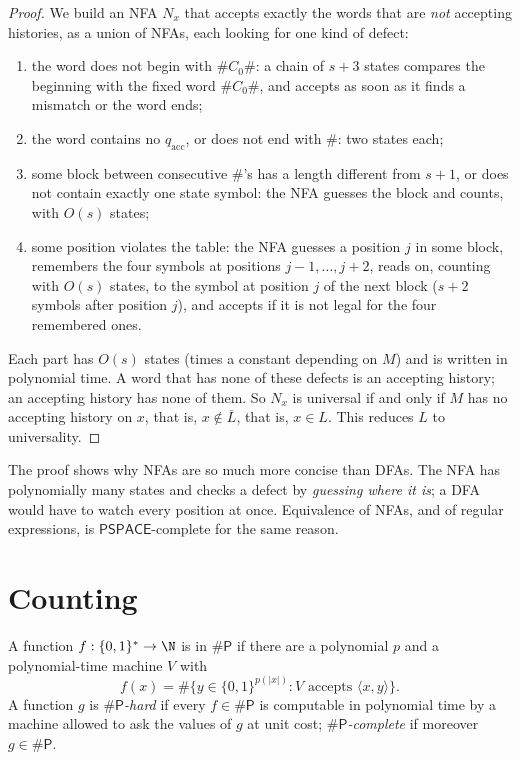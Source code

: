 \begin{proof}
We build an NFA $N_x$ that accepts exactly the words that are \emph{not} accepting histories, as a union of NFAs, each looking for one kind of defect:
\begin{enumerate}
\item the word does not begin with $\#C_0\#$: a chain of $s+3$ states compares the beginning with the fixed word $\#C_0\#$, and accepts as soon as it finds a mismatch or the word ends;
\item the word contains no $q_{\mathrm{acc}}$, or does not end with $\#$: two states each;
\item some block between consecutive $\#$'s has a length different from $s+1$, or does not contain exactly one state symbol: the NFA guesses the block and counts, with $O(s)$ states;
\item some position violates the table: the NFA guesses a position $j$ in some block, remembers the four symbols at positions $j-1,\dots,j+2$, reads on, counting with $O(s)$ states, to the symbol at position $j$ of the next block ($s+2$ symbols after position $j$), and accepts if it is not legal for the four remembered ones.
\end{enumerate}
Each part has $O(s)$ states (times a constant depending on $M$) and is written in polynomial time. A word that has none of these defects is an accepting history; an accepting history has none of them. So $N_x$ is universal if and only if $M$ has no accepting history on $x$, that is, $x\notin\bar L$, that is, $x\in L$. This reduces $L$ to universality.
\end{proof}

The proof shows why NFAs are so much more concise than DFAs. The NFA has polynomially many states and checks a defect by \emph{guessing where it is}; a DFA would have to watch every position at once. Equivalence of NFAs, and of regular expressions, is $\mathsf{PSPACE}$-complete for the same reason.

\section{Counting}\label{sec:counting}

\begin{definition}\label{def:sharpp}
A function $f:\{0,1\}^*\to\N$ is in $\#\mathsf P$ if there are a polynomial $p$ and a polynomial-time machine $V$ with
\[
f(x)=\#\bigl\{y\in\{0,1\}^{p(|x|)}:V\text{ accepts }\langle x,y\rangle\bigr\}.
\]
A function $g$ is \emph{$\#\mathsf P$-hard} if every $f\in\#\mathsf P$ is computable in polynomial time by a machine allowed to ask the values of $g$ at unit cost; \emph{$\#\mathsf P$-complete} if moreover $g\in\#\mathsf P$.
\end{definition}

